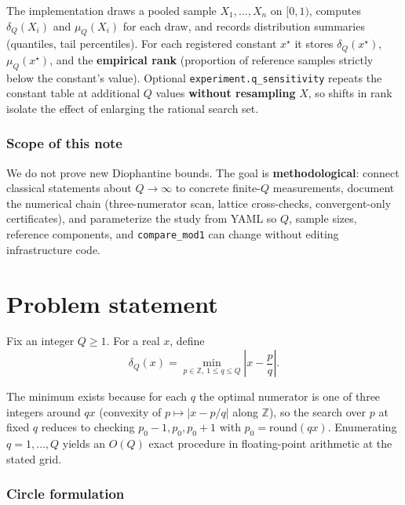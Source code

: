 \documentclass[
]{article}
\begin{document}
The implementation draws a pooled sample \(X_1,\ldots,X_n\) on
\([0,1)\), computes \(\delta_Q(X_i)\) and \(\mu_Q(X_i)\) for each draw,
and records distribution summaries (quantiles, tail percentiles). For
each registered constant \(x^\star\) it stores \(\delta_Q(x^\star)\),
\(\mu_Q(x^\star)\), and the \textbf{empirical rank} (proportion of
reference samples strictly below the constant's value). Optional
\texttt{experiment.q\_sensitivity} repeats the constant table at
additional \(Q\) values \textbf{without resampling} \(X\), so shifts in
rank isolate the effect of enlarging the rational search set.

\subsubsection{Scope of this note}\label{scope-of-this-note}

We do not prove new Diophantine bounds. The goal is
\textbf{methodological}: connect classical statements about
\(Q\to\infty\) to concrete finite-\(Q\) measurements, document the
numerical chain (three-numerator scan, lattice cross-checks,
convergent-only certificates), and parameterize the study from YAML so
\(Q\), sample sizes, reference components, and \texttt{compare\_mod1}
can change without editing infrastructure code.

\newpage

\section{Problem statement}\label{problem-statement}

Fix an integer \(Q \geq 1\). For a real \(x\), define \begin{equation}
\label{eq:delta}
\delta_Q(x) = \min_{p \in \mathbb{Z},\, 1 \leq q \leq Q} \left| x - \frac{p}{q} \right|.
\end{equation}

The minimum exists because for each \(q\) the optimal numerator is one
of three integers around \(qx\) (convexity of \(p \mapsto |x-p/q|\)
along \(\mathbb{Z}\)), so the search over \(p\) at fixed \(q\) reduces
to checking \(p_0-1,p_0,p_0+1\) with \(p_0=\mathrm{round}(qx)\).
Enumerating \(q=1,\ldots,Q\) yields an \(O(Q)\) exact procedure in
floating-point arithmetic at the stated grid.

\subsubsection{Circle formulation}\label{circle-formulation}
\end{document}
